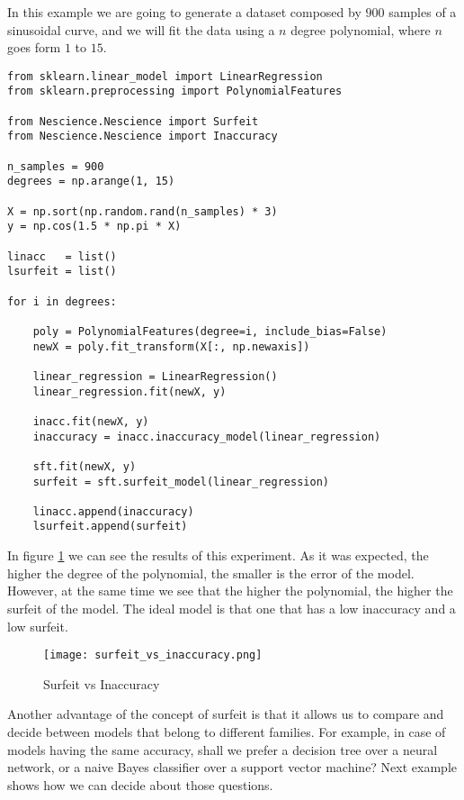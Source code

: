 \begin{example}
\label{ex:surfeit_overfit}
In this example we are going to generate a dataset composed by $900$ samples of a sinusoidal curve, and we will fit the data using a $n$ degree polynomial, where $n$ goes form $1$ to $15$.

\begin{sourcecode}
{\scriptsize \begin{verbatim}
from sklearn.linear_model import LinearRegression
from sklearn.preprocessing import PolynomialFeatures

from Nescience.Nescience import Surfeit
from Nescience.Nescience import Inaccuracy

n_samples = 900
degrees = np.arange(1, 15)

X = np.sort(np.random.rand(n_samples) * 3)
y = np.cos(1.5 * np.pi * X)

linacc   = list()
lsurfeit = list()

for i in degrees:
        
    poly = PolynomialFeatures(degree=i, include_bias=False)
    newX = poly.fit_transform(X[:, np.newaxis])
    
    linear_regression = LinearRegression()
    linear_regression.fit(newX, y)

    inacc.fit(newX, y)
    inaccuracy = inacc.inaccuracy_model(linear_regression)
    
    sft.fit(newX, y)
    surfeit = sft.surfeit_model(linear_regression)
    
    linacc.append(inaccuracy)
    lsurfeit.append(surfeit)
\end{verbatim}}
\end{sourcecode}

In figure \ref{figure:surfeit_vs_inaccuracy} we can see the results of this experiment. As it was expected, the higher the degree of the polynomial, the smaller is the error of the model. However, at the same time we see that the higher the polynomial, the higher the surfeit of the model. The ideal model is that one that has a low inaccuracy and a low surfeit.

\begin{figure}[h]
\centering
\texttt{[image: surfeit\_vs\_inaccuracy.png]}
\caption{Surfeit vs Inaccuracy}
\label{figure:surfeit_vs_inaccuracy}
\end{figure}

\end{example}

Another advantage of the concept of surfeit is that it allows us to compare and decide between models that belong to different families. For example, in case of models having the same accuracy, shall we prefer a decision tree over a neural network, or a naive Bayes classifier over a support vector machine? Next example shows how we can decide about those questions.

